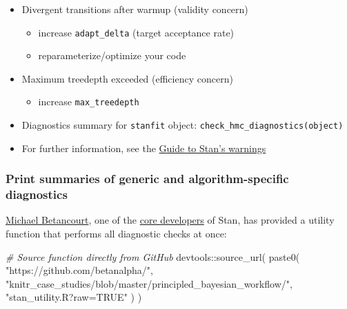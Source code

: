 \documentclass[
  11pt,
]{article}
\newenvironment{Shaded}{\begin{snugshade}}{\end{snugshade}}
\newcommand{\CommentTok}[1]{\textcolor[rgb]{0.56,0.35,0.01}{\textit{#1}}}
\newcommand{\FunctionTok}[1]{\textcolor[rgb]{0.00,0.00,0.00}{#1}}
\newcommand{\NormalTok}[1]{#1}
\newcommand{\SpecialCharTok}[1]{\textcolor[rgb]{0.00,0.00,0.00}{#1}}
\newcommand{\StringTok}[1]{\textcolor[rgb]{0.31,0.60,0.02}{#1}}
\providecommand{\tightlist}{%
  \setlength{\itemsep}{0pt}\setlength{\parskip}{0pt}}
\begin{document}
\begin{itemize}
\tightlist
\item
  Divergent transitions after warmup (validity concern)

  \begin{itemize}
  \tightlist
  \item
    increase \texttt{adapt\_delta} (target acceptance rate)
  \item
    reparameterize/optimize your code
  \end{itemize}
\item
  Maximum treedepth exceeded (efficiency concern)

  \begin{itemize}
  \tightlist
  \item
    increase \texttt{max\_treedepth}
  \end{itemize}
\item
  Diagnostics summary for \texttt{stanfit} object: \texttt{check\_hmc\_diagnostics(object)}
\item
  For further information, see the \href{https://mc-stan.org/misc/warnings.html}{Guide to Stan's warnings}
\end{itemize}

\hypertarget{print-summaries-of-generic-and-algorithm-specific-diagnostics}{%
\subsubsection{Print summaries of generic and algorithm-specific diagnostics}\label{print-summaries-of-generic-and-algorithm-specific-diagnostics}}

\href{https://betanalpha.github.io/}{Michael Betancourt}, one of the
\href{https://mc-stan.org/about/team/}{core developers} of Stan, has provided a
utility function that performs all diagnostic checks at once:

\begin{Shaded}
\begin{Highlighting}[]
\CommentTok{\# Source function directly from GitHub}
\NormalTok{devtools}\SpecialCharTok{::}\FunctionTok{source\_url}\NormalTok{(}
  \FunctionTok{paste0}\NormalTok{(}
    \StringTok{"https://github.com/betanalpha/"}\NormalTok{,}
    \StringTok{"knitr\_case\_studies/blob/master/principled\_bayesian\_workflow/"}\NormalTok{,}
    \StringTok{"stan\_utility.R?raw=TRUE"}
\NormalTok{  )}
\NormalTok{)}
\end{Highlighting}
\end{Shaded}
\end{document}
